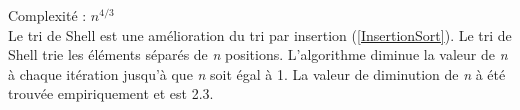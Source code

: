 \label{ShellSort}
\footnotesize 
\noindent
Complexité :  $n^{4/3}$
\\
\normalsize
Le tri de Shell est une amélioration du tri par insertion (\ref{InsertionSort}). Le tri de Shell trie les éléments séparés de \emph{n} positions. L'algorithme diminue la valeur de \emph{n} à chaque itération jusqu'à que \emph{n} soit égal à 1. La valeur de diminution de \emph{n} à été trouvée empiriquement et est 2.3.